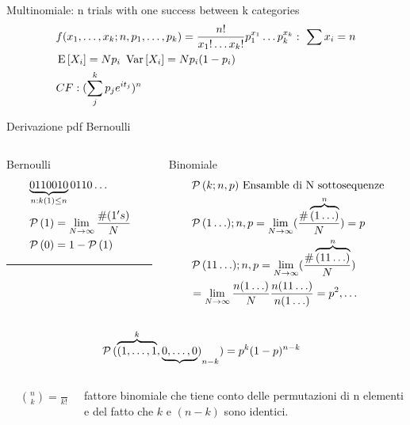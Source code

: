 \documentclass[asd-beamer.tex]{subfiles}
\begin{document}
\begin{frame}{Multinomiale: n trials with one success between k categories}
	\begin{align*}
	&f(x_1,\ldots,x_k;n,p_1,\ldots,p_k)=\frac{n!}{x_1!\ldots x_k!}p_1^{x_1}\ldots p_k^{x_k}:\ \sum x_i=n\\
	&\operatorname{E}{[X_i]}=Np_i\ \operatorname{Var}{[X_i]}=Np_i(1-p_i)\\
	&CF: (\sum_j^kp_je^{it_j})^n
	\end{align*}
\end{frame}

\begin{wordonframe}{Derivazione pdf Bernoulli}
\begin{columns}[T]
\begin{column}{0.3\textwidth}
\begin{block}{Bernoulli}
\begin{align*}
&\underbrace{0110010}_{n:k(1)\leq n}0110\ldots\\
&\operatorname{\mathcal{P}}{(1)}=\lim_{N\to\infty}\frac{\#(1's)}{N}\\
&\operatorname{\mathcal{P}}{(0)}=1-\operatorname{\mathcal{P}}{(1)}\\
\end{align*}
\noindent\rule{0.9\textwidth}{0.4pt}
\end{block}
\end{column}
\begin{column}{0.7\textwidth}
\begin{block}{Binomiale}
\begin{align*}
&\operatorname{\mathcal{P}}{(k;n,p)}\ \text{Ensamble di N sottosequenze}\\
&\operatorname{\mathcal{P}}{(1\ldots);n,p}=\lim_{N\to\infty}(\frac{\#\overbrace{(1\ldots)}^n}{N})=p\\
&\operatorname{\mathcal{P}}{(11\ldots);n,p}=\lim_{N\to\infty}(\frac{\#\overbrace{(11\ldots)}^n}{N})\\
&=\lim_{N\to\infty}\frac{n(1\ldots)}{N}\frac{n(11\ldots)}{n(1\ldots)}=p^2, \ldots
\end{align*}
\end{block}
\end{column}
\end{columns}
\begin{align*}
&\operatorname{\mathcal{P}}{(\overbrace{(1,\ldots,1}^k,\underbrace{0,\ldots,0})}_{n-k})=p^k(1-p)^{n-k}
\end{align*}
\begin{columns}[T]
\begin{column}{0.2\textwidth}
\begin{align*}
&\binom{n}{k}=\frac{n!}{k!(n-k)!}
\end{align*}
\end{column}
\begin{column}{0.8\textwidth}
fattore binomiale che tiene conto delle permutazioni di n elementi e del fatto che $k$ e $(n-k)$ sono identici.
\end{column}
\end{columns}
\end{wordonframe}
\end{document}
